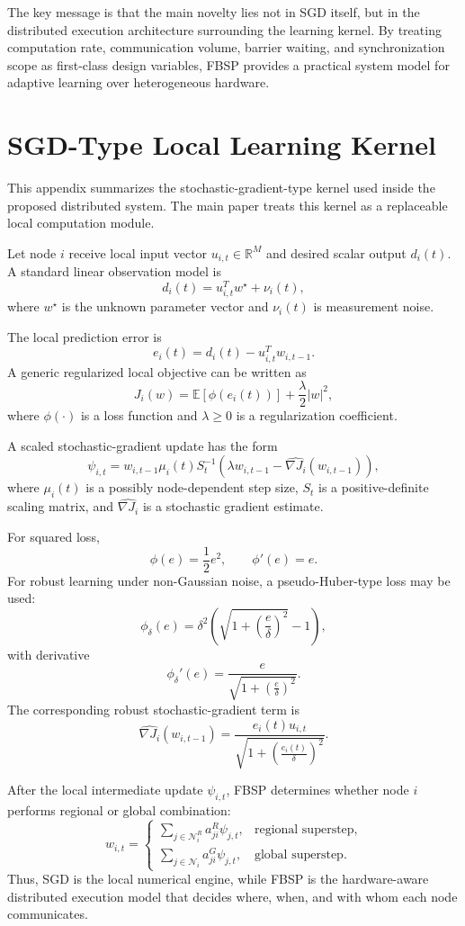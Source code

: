 ﻿\documentclass[10pt,journal]{IEEEtran}
\begin{document}
	The key message is that the main novelty lies not in SGD itself, but in the distributed execution architecture surrounding the learning kernel. By treating computation rate, communication volume, barrier waiting, and synchronization scope as first-class design variables, FBSP provides a practical system model for adaptive learning over heterogeneous hardware.
	
	\appendices
	
	\section{SGD-Type Local Learning Kernel}
	
	This appendix summarizes the stochastic-gradient-type kernel used inside the proposed distributed system. The main paper treats this kernel as a replaceable local computation module.
	
	Let node $i$ receive local input vector $u_{i,t}\in\mathbb{R}^M$ and desired scalar output $d_i(t)$. A standard linear observation model is
	\[
	d_i(t)=u_{i,t}^{T}w^\star+\nu_i(t),
	\]
	where $w^\star$ is the unknown parameter vector and $\nu_i(t)$ is measurement noise.
	
	The local prediction error is
	\[
	e_i(t)=d_i(t)-u_{i,t}^{T}w_{i,t-1}.
	\]
	A generic regularized local objective can be written as
	\[
	J_i(w)
	=
	\mathbb{E}\left[\phi(e_i(t))\right]
	+
	\frac{\lambda}{2}|w|^2,
	\]
	where $\phi(\cdot)$ is a loss function and $\lambda\geq0$ is a regularization coefficient.
	
	A scaled stochastic-gradient update has the form
	\[
	\psi_{i,t}
	=
	w_{i,t-1}
	\mu_i(t)S_t^{-1}
	\left(
	\lambda w_{i,t-1}
	-
	\widehat{\nabla J_i}(w_{i,t-1})
	\right),
	\]
	where $\mu_i(t)$ is a possibly node-dependent step size, $S_t$ is a positive-definite scaling matrix, and $\widehat{\nabla J_i}$ is a stochastic gradient estimate.
	
	For squared loss,
	\[
	\phi(e)=\frac{1}{2}e^2,
	\qquad
	\phi'(e)=e.
	\]
	For robust learning under non-Gaussian noise, a pseudo-Huber-type loss may be used:
	\[
	\phi_\delta(e)
	=
	\delta^2\left(
	\sqrt{1+\left(\frac{e}{\delta}\right)^2}-1
	\right),
	\]
	with derivative
	\[
	\phi_\delta'(e)
	=
	\frac{e}{\sqrt{1+\left(\frac{e}{\delta}\right)^2}}.
	\]
	The corresponding robust stochastic-gradient term is
	\[
	\widehat{\nabla J_i}(w_{i,t-1})
	=
	\frac{e_i(t)u_{i,t}}
	{\sqrt{1+\left(\frac{e_i(t)}{\delta}\right)^2}}.
	\]
	
	After the local intermediate update $\psi_{i,t}$, FBSP determines whether node $i$ performs regional or global combination:
	\[
	w_{i,t}
	=
	\begin{cases}
		\sum_{j\in\mathcal{N}_i^R}a_{ji}^{R}\psi_{j,t}, & \text{regional superstep},\\[2mm]
		\sum_{j\in\mathcal{N}_i}a_{ji}^{G}\psi_{j,t}, & \text{global superstep}.
	\end{cases}
	\]
	Thus, SGD is the local numerical engine, while FBSP is the hardware-aware distributed execution model that decides where, when, and with whom each node communicates.
	
\end{document}
